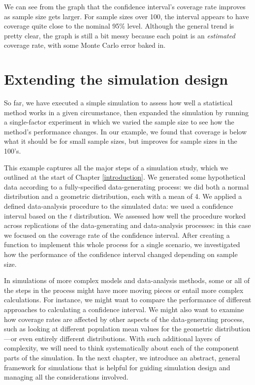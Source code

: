 \documentclass[
]{book}
\begin{document}
We can see from the graph that the confidence interval's coverage rate improves as sample size gets larger. For sample sizes over 100, the interval appears to have coverage quite close to the nominal 95\% level.
Although the general trend is pretty clear, the graph is still a bit messy because each point is an \emph{estimated} coverage rate, with some Monte Carlo error baked in.

\section{Extending the simulation design}\label{extending-the-simulation-design}

So far, we have executed a simple simulation to assess how well a statistical method works in a given circumstance, then expanded the simulation by running a single-factor experiment in which we varied the sample size to see how the method's performance changes.
In our example, we found that coverage is below what it should be for small sample sizes, but improves for sample sizes in the 100's.

This example captures all the major steps of a simulation study, which we outlined at the start of Chapter \ref{introduction}.
We generated some hypothetical data according to a fully-specified data-generating process: we did both a normal distribution and a geometric distribution, each with a mean of 4.
We applied a defined data-analysis procedure to the simulated data: we used a confidence interval based on the \(t\) distribution.
We assessed how well the procedure worked across replications of the data-generating and data-analysis processes: in this case we focused on the coverage rate of the confidence interval.
After creating a function to implement this whole process for a single scenario, we investigated how the performance of the confidence interval changed depending on sample size.

In simulations of more complex models and data-analysis methods, some or all of the steps in the process might have more moving pieces or entail more complex calculations.
For instance, we might want to compare the performance of different approaches to calculating a confidence interval.
We might also want to examine how coverage rates are affected by other aspects of the data-generating process, such as looking at different population mean values for the geometric distribution---or even entirely different distributions.
With such additional layers of complexity, we will need to think systematically about each of the component parts of the simulation.
In the next chapter, we introduce an abstract, general framework for simulations that is helpful for guiding simulation design and managing all the considerations involved.
\end{document}
